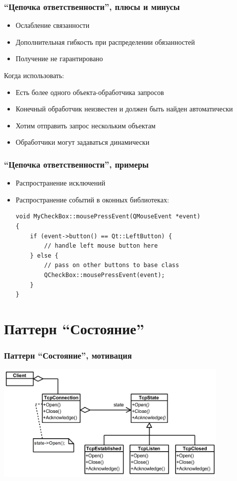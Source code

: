 \documentclass[xetex,mathserif,serif]{beamer}
\begin{document}
    \begin{frame}
        \frametitle{``Цепочка ответственности'', плюсы и минусы}
        \begin{itemize}
            \item Ослабление связанности
            \item Дополнительная гибкость при распределении обязанностей
            \item Получение не гарантировано
        \end{itemize}
        Когда использовать:
        \begin{itemize}
            \item Есть более одного объекта-обработчика запросов
            \item Конечный обработчик неизвестен и должен быть найден автоматически
            \item Хотим отправить запрос нескольким объектам
            \item Обработчики могут задаваться динамически
        \end{itemize}
    \end{frame}

    \begin{frame}[fragile]
        \frametitle{``Цепочка ответственности'', примеры}
        \begin{itemize}
            \item Распространение исключений
            \item Распространение событий в оконных библиотеках:
            \begin{verbatim}
void MyCheckBox::mousePressEvent(QMouseEvent *event)
{
    if (event->button() == Qt::LeftButton) {
        // handle left mouse button here
    } else {
        // pass on other buttons to base class
        QCheckBox::mousePressEvent(event);
    }
}
            \end{verbatim}
        \end{itemize}
    \end{frame}

    \section{Паттерн ``Состояние''}

    \begin{frame}
        \frametitle{Паттерн ``Состояние'', мотивация}
        \begin{center}
            \includegraphics[width=0.85\textwidth]{stateExample.png}
        \end{center}
    \end{frame}
\end{document}

